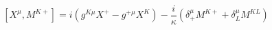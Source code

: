 \begin{equation}\label{12a}
\left[X^{\mu},M^{K+}\right]=i\left(g^{K\mu}X^{+}-g^{+\mu}X^{K}\right)
-\frac{i}{\kappa}\left(\delta_{+}^{\mu}M^{K+}+\delta_{L}^{\mu}M^{KL}\right)
\end{equation}

